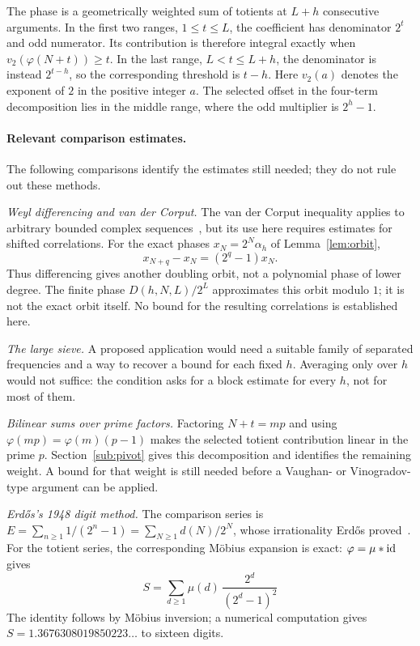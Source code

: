 \documentclass[11pt]{article}
\theoremstyle{plain}
\theoremstyle{definition}
\theoremstyle{remark}
\let\origmathrm\mathrm
\renewcommand{\mathrm}[1]{\ifmmode\origmathrm{#1}\else\textrm{#1}\fi}%
\begin{document}
The phase is a geometrically weighted sum of totients at $L+h$
consecutive arguments. In the first two ranges, $1\le t\le L$, the
coefficient has denominator $2^t$ and odd numerator. Its contribution is
therefore integral exactly when $v_2(\varphi(N+t))\ge t$. In the last range,
$L<t\le L+h$, the denominator is instead $2^{t-h}$, so the corresponding
threshold is $t-h$. Here $v_2(a)$ denotes the exponent of $2$ in the
positive integer $a$. The selected offset in the four-term decomposition
lies in the middle range, where the odd multiplier is $2^h-1$.

\paragraph{Relevant comparison estimates.}
The following comparisons identify the estimates still needed; they do
not rule out these methods.

\emph{Weyl differencing and van der Corput.} The van der Corput inequality
applies to arbitrary bounded complex sequences~\cite[Theorem~2.1]{edeko-vdc},
but its use here requires estimates for shifted correlations. For the exact
phases $x_N=2^N\alpha_h$ of Lemma~\ref{lem:orbit},
\[
 x_{N+q}-x_N=(2^q-1)x_N.
\]
Thus differencing gives another doubling orbit, not a polynomial phase of
lower degree. The finite phase $D(h,N,L)/2^L$ approximates this orbit modulo
$1$; it is not the exact orbit itself. No bound for the resulting
correlations is established here.

\emph{The large sieve.} A proposed application would need a suitable
family of separated frequencies and a way to recover a bound for each
fixed $h$. Averaging only over $h$ would not suffice: the condition asks
for a block estimate for every $h$, not for most of them.

\emph{Bilinear sums over prime factors.} Factoring $N+t=mp$ and using
$\varphi(mp)=\varphi(m)(p-1)$ makes the selected totient contribution linear
in the prime $p$. Section~\ref{sub:pivot} gives this decomposition and
identifies the remaining weight. A bound for that weight is still needed
before a Vaughan- or Vinogradov-type argument can be applied.

\emph{Erd\H{o}s's 1948 digit method.} The comparison series is
$E=\sum_{n\ge1}1/(2^n-1)=\sum_{N\ge1}d(N)/2^N$, whose irrationality
Erd\H{o}s proved~\cite{erdos1948lambert}. For the totient series, the
corresponding M\"obius expansion is exact: $\varphi=\mu * \mathrm{id}$ gives
\begin{equation}\label{eq:mobmers}
  S=\sum_{d\ge 1}\mu(d)\,\frac{2^{d}}{(2^{d}-1)^{2}}
\end{equation}
The identity follows by M\"obius inversion; a numerical computation gives
$S=1.3676308019850223\ldots$ to sixteen digits.
\end{document}
